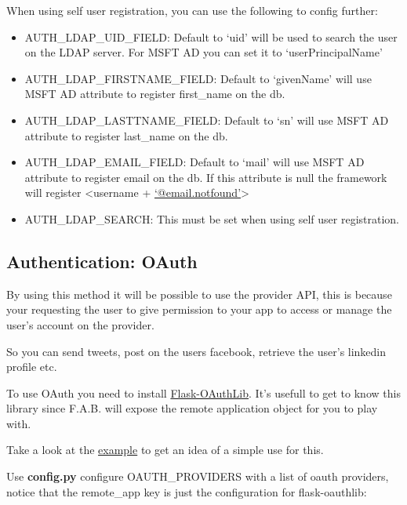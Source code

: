 \documentclass[letterpaper,10pt,english]{sphinxmanual}
\begin{document}
When using self user registration, you can use the following to config further:
\begin{itemize}
\item {} 
AUTH\_LDAP\_UID\_FIELD: Default to `uid' will be used to search the user on the LDAP server. For MSFT AD you can set it to `userPrincipalName'

\item {} 
AUTH\_LDAP\_FIRSTNAME\_FIELD: Default to `givenName' will use MSFT AD attribute to register first\_name on the db.

\item {} 
AUTH\_LDAP\_LASTTNAME\_FIELD: Default to `sn' will use MSFT AD attribute to register last\_name on the db.

\item {} 
AUTH\_LDAP\_EMAIL\_FIELD: Default to `mail' will use MSFT AD attribute to register email on the db. If this attribute is null the framework will register \textless{}username + \href{mailto:'@email.notfound'}{`@email.notfound'}\textgreater{}

\item {} 
AUTH\_LDAP\_SEARCH: This must be set when using self user registration.

\end{itemize}


\subsection{Authentication: OAuth}
\label{security:authentication-oauth}
By using this method it will be possible to use the provider API, this is because your requesting the user to give
permission to your app to access or manage the user's account on the provider.

So you can send tweets, post on the users facebook, retrieve the user's linkedin profile etc.

To use OAuth you need to install \href{https://flask-oauthlib.readthedocs.org/en/latest/}{Flask-OAuthLib}. It's usefull
to get to know this library since F.A.B. will expose the remote application object for you to play with.

Take a look at the \href{https://github.com/dpgaspar/Flask-AppBuilder/tree/master/examples/oauth}{example}
to get an idea of a simple use for this.

Use \textbf{config.py} configure OAUTH\_PROVIDERS with a list of oauth providers, notice that the remote\_app
key is just the configuration for flask-oauthlib:
\end{document}
